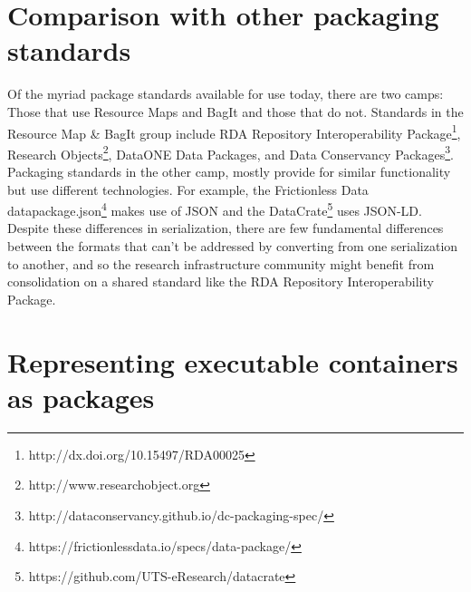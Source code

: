\documentclass[conference]{IEEEtran}
\begin{document}
\section{Comparison with other packaging standards}

Of the myriad package standards available for use today, there are two camps: Those that use Resource Maps and BagIt and those that do not.
Standards in the Resource Map \& BagIt group include RDA Repository Interoperability Package\footnote{http://dx.doi.org/10.15497/RDA00025}, Research Objects\footnote{http://www.researchobject.org}, DataONE Data Packages, and Data Conservancy Packages\footnote{http://dataconservancy.github.io/dc-packaging-spec/}.
Packaging standards in the other camp, mostly provide for similar functionality but use different technologies.
For example, the Frictionless Data datapackage.json\footnote{https://frictionlessdata.io/specs/data-package/} makes use of JSON and the DataCrate\footnote{https://github.com/UTS-eResearch/datacrate} uses JSON-LD.
Despite these differences in serialization, there are few fundamental differences between the formats that can’t be addressed by converting from one serialization to another, and so the research infrastructure community might benefit from consolidation on a shared standard like the RDA Repository Interoperability Package.

\section{Representing executable containers as packages}
\end{document}
